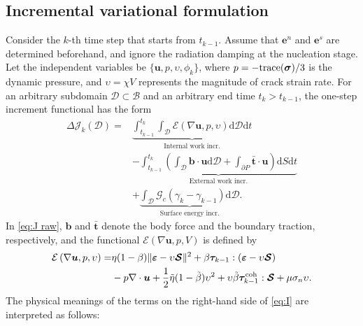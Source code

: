 \documentclass{article}
\begin{document}
\subsection{Incremental variational formulation}

Consider the $k$-th time step that starts from $t_{k-1}$. Assume that $\bm e^n$ and $\bm e^s$ are determined beforehand, and ignore the radiation damping at the nucleation stage. Let the independent variables be $\{\bm u, p, \upsilon, \phi_k\}$, where $p = -{\rm trace}(\bm\sigma)/3$ is the dynamic pressure, and $\upsilon = \chi V$ represents the magnitude of crack strain rate. For an arbitrary subdomain $\mathcal D\subset\mathcal B$ and an arbitrary end time $t_k > t_{k-1}$, the one-step increment functional has the form
\begin{equation}\label{eq:J raw}
  \begin{aligned}
    \Delta\mathcal J_k(\mathcal D)
    =&\underbrace{\int_{t_{k-1}}^{t_k}\int_{\mathcal D}\mathcal E\left(\nabla\bm u, p, \upsilon\right)\mathrm d\mathcal D\mathrm dt}_{\text{Internal work incr.}} \\
     &-\underbrace{\int_{t_{k-1}}^{t_k}\left(\int_{\mathcal D}\bm b\cdot\bm u\mathrm d\mathcal D + \int_{\mathcal\partial P}\bar{\bm t}\cdot\bm u\right)\mathrm dS\mathrm dt}_{\text{External work incr.}} \\
     &+\underbrace{\int_{\mathcal D}\mathcal G_c(\gamma_k - \gamma_{k-1})\mathrm d\mathcal D}_{\text{Surface energy incr.}}.
  \end{aligned}
\end{equation}
In \eqref{eq:J raw}, $\bm b$ and $\bar{\bm t}$ denote the body force and the boundary traction, respectively, and the functional $\mathcal E\left(\nabla\bm u, p, V\right)$ is defined by 
\begin{equation}\label{eq:I}
  \begin{aligned}
    \mathcal E\left(\nabla\bm u, p, \upsilon\right)
    =&\eta(1 - \beta)\Vert\bm\varepsilon - \upsilon\bm{\mathcal S}\Vert^2 + \beta\bm\tau_{k-1} : (\bm\varepsilon - \upsilon\bm{\mathcal S}) \\
    &- p\nabla\cdot\bm u + \frac{1}{2}\tilde\eta(1-\tilde\beta)\upsilon^2 + \upsilon\tilde\beta\bm\tau_{k-1}^{\rm coh} : \bm{\mathcal S} + \mu\sigma_n\upsilon.
  \end{aligned}
\end{equation}
The physical meanings of the terms on the right-hand side of \eqref{eq:I} are interpreted as follows:
\end{document}
